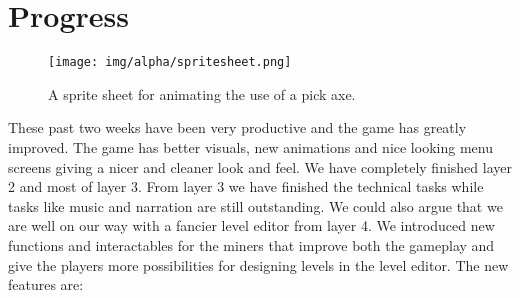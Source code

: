 \section{Progress}

\begin{figure}[ht]
\centering
\texttt{[image: img/alpha/spritesheet.png]}
\caption{A sprite sheet for animating the use of a pick axe.}
\end{figure}

These past two weeks have been very productive and the game has greatly improved. The game has better visuals, new animations and nice looking menu screens giving a nicer and cleaner look and feel. We have completely finished layer 2 and most of layer 3. From layer 3 we have finished the technical tasks while tasks like music and narration are still outstanding. We could also argue that we are well on our way with a fancier level editor from layer 4. We introduced new functions and interactables for the miners that improve both the gameplay and give the players more possibilities for designing levels in the level editor. The new features are:

